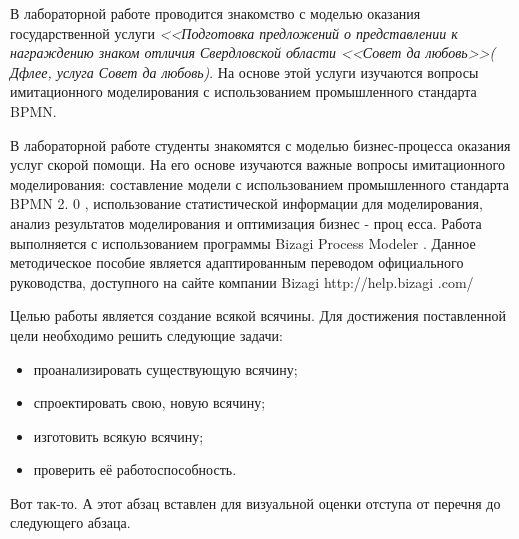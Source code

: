 \Introduction

В лабораторной работе проводится знакомство с моделью оказания
государственной услуги \textit{<<Подготовка предложений о представлении
к награждению знаком отличия Свердловской области <<Совет да любовь>>(
Дфлее, услуга Совет да любовь)}. На основе этой услуги
изучаются вопросы имитационного моделирования с использованием
промышленного стандарта BPMN.


В лабораторной работе студенты знакомятся с моделью
бизнес-процесса оказания услуг скорой помощи. На его основе
изучаются  важные  вопросы
имитационного  моделирования:  составление  модели  с  использованием
промышленного   стандарта
BPMN
2.
0
,   использование   статистической
информации  для  моделирования,  анализ  результатов  моделирования  и
оптимизация   бизнес
-
проц
есса.   Работа   выполняется   с   использованием
программы
Bizagi
Process
Modeler
.
Данное  методическое  пособие  является  адаптированным  переводом
официального   руководства,   доступного   на   сайте   компании
Bizagi
http://help.bizagi
.com/

Целью работы является создание всякой всячины. Для достижения поставленной цели необходимо решить следующие задачи:

\begin{itemize}
\item проанализировать существующую всячину;
\item спроектировать свою, новую всячину;
\item изготовить всякую всячину;
\item проверить её работоспособность.
\end{itemize}

Вот так-то. А этот абзац вставлен для визуальной оценки отступа от перечня до следующего абзаца.